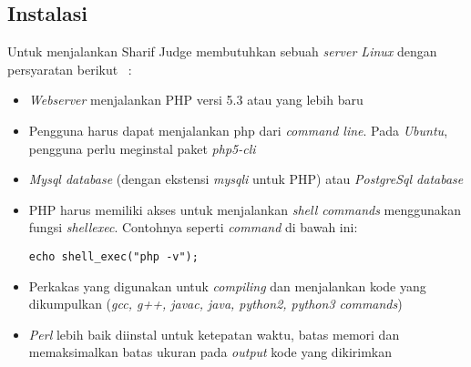 \subsection{Instalasi}
Untuk menjalankan Sharif Judge membutuhkan sebuah \textit{server Linux} dengan persyaratan berikut ~\cite{mjnaderi:14:sharifjudgedoc}:
\begin{itemize}
	\item \textit{Webserver} menjalankan PHP versi 5.3 atau yang lebih baru
	\item Pengguna harus dapat menjalankan php dari \textit{command line}. Pada \textit{Ubuntu}, pengguna perlu meginstal paket \textit{php5-cli}
	\item \textit{Mysql database} (dengan ekstensi \textit{mysqli} untuk PHP) atau \textit{PostgreSql database}
	\item PHP harus memiliki akses untuk menjalankan \textit{shell commands} menggunakan fungsi \textit{shell\textunderscore exec}. Contohnya seperti \textit{command} di bawah ini: 
		\begin{lstlisting}[backgroundcolor = \color{lightgray}]
echo shell_exec("php -v");
		\end{lstlisting}
	\item Perkakas yang digunakan untuk \textit{compiling} dan menjalankan kode yang dikumpulkan (\textit{gcc, g++, javac, java, python2, python3 commands})
	\item \textit{Perl} lebih baik diinstal untuk ketepatan waktu, batas memori dan memaksimalkan batas ukuran pada \textit{output} kode yang dikirimkan
\end{itemize}



